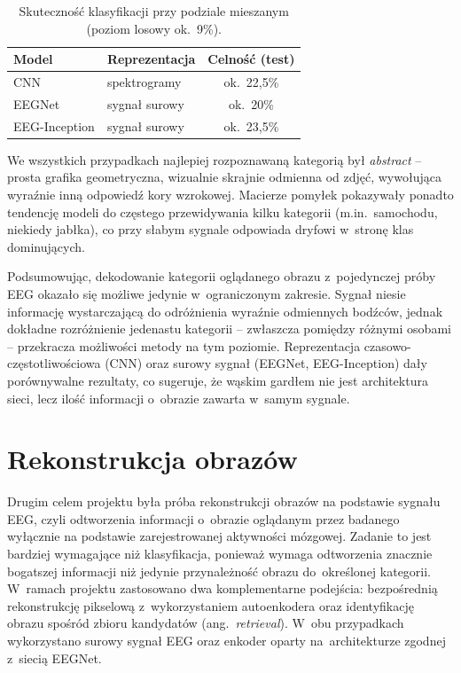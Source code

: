 \documentclass[12pt,a4paper,numbers=enddot,headings=small]{scrartcl} %
\begin{document}
	\begin{table}[h]
		\centering
		\begin{tabular}{llc}
			\hline
			Model & Reprezentacja & Celność (test) \\
			\hline
			CNN           & spektrogramy   & ok.~22,5\% \\
			EEGNet        & sygnał surowy  & ok.~20\% \\
			EEG-Inception & sygnał surowy  & ok.~23,5\% \\
			\hline
		\end{tabular}
		\caption{Skuteczność klasyfikacji przy podziale mieszanym (poziom losowy ok.~9\%).}
		\label{tab:porownanie-metod}
	\end{table}
	
	We wszystkich przypadkach najlepiej rozpoznawaną kategorią był \textit{abstract}
	-- prosta grafika geometryczna, wizualnie skrajnie odmienna od zdjęć, wywołująca
	wyraźnie inną odpowiedź kory wzrokowej. Macierze pomyłek pokazywały ponadto
	tendencję modeli do częstego przewidywania kilku kategorii (m.in.~samochodu,
	niekiedy jabłka), co przy słabym sygnale odpowiada dryfowi w~stronę klas
	dominujących.
	
	Podsumowując, dekodowanie kategorii oglądanego obrazu z~pojedynczej próby EEG
	okazało się możliwe jedynie w~ograniczonym zakresie. Sygnał niesie informację
	wystarczającą do odróżnienia wyraźnie odmiennych bodźców, jednak dokładne
	rozróżnienie jedenastu kategorii -- zwłaszcza pomiędzy różnymi osobami --
	przekracza możliwości metody na tym poziomie. Reprezentacja
	czasowo-częstotliwościowa (CNN) oraz surowy sygnał (EEGNet, EEG-Inception)
	dały porównywalne rezultaty, co sugeruje, że wąskim gardłem nie jest
	architektura sieci, lecz ilość informacji o~obrazie zawarta w~samym sygnale.
	
	\section{Rekonstrukcja obrazów}
	
	Drugim celem projektu była próba rekonstrukcji obrazów na podstawie sygnału
	EEG, czyli odtworzenia informacji o~obrazie oglądanym przez badanego
	wyłącznie na podstawie zarejestrowanej aktywności mózgowej. Zadanie to jest
	bardziej wymagające niż klasyfikacja, ponieważ wymaga odtworzenia znacznie
	bogatszej informacji niż jedynie przynależność obrazu do~określonej kategorii.
	W~ramach projektu zastosowano dwa komplementarne podejścia: bezpośrednią
	rekonstrukcję pikselową z~wykorzystaniem autoenkodera oraz identyfikację
	obrazu spośród zbioru kandydatów (ang.~\textit{retrieval}). W~obu przypadkach
	wykorzystano surowy sygnał EEG oraz enkoder oparty na~architekturze zgodnej
	z~siecią EEGNet.
	
\end{document}
